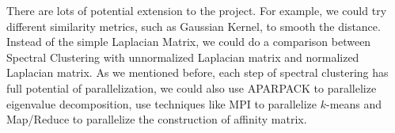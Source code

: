 \documentclass{acm_proc_article-sp}
\begin{document}
There are lots of potential extension to the project. For example, we could try different similarity metrics, such as Gaussian Kernel, to smooth the distance. Instead of the simple Laplacian Matrix, we could do a comparison between Spectral Clustering with unnormalized Laplacian matrix and normalized Laplacian matrix. As we mentioned before, each step of spectral clustering has full potential of parallelization, we could also use APARPACK to parallelize eigenvalue decomposition, use techniques like MPI to parallelize $k$-means and Map/Reduce to parallelize the construction of affinity matrix.

%
%

\balancecolumns
\end{document}

